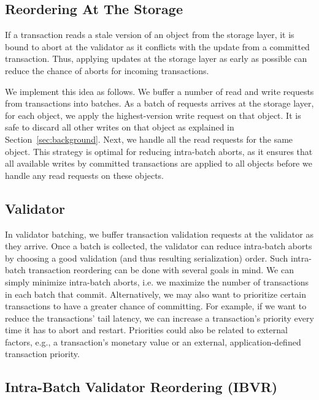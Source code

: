 \subsection{Reordering At The Storage}
If a transaction reads a stale version of an object from the storage layer, it is bound to 
abort at the validator as it conflicts with the update from a committed transaction. 
Thus, applying updates at the storage layer as early as possible can 
reduce the chance of aborts for incoming transactions.

We implement this idea as follows. We buffer a number of read and write requests from transactions into batches. 
As a batch of requests arrives at the storage layer, for each object, we apply the highest-version write request on that object. It is safe to discard all other writes on that object as explained in Section~\ref{sec:background}. Next, we handle all the read requests for the same object. This strategy is optimal for reducing intra-batch aborts, as it ensures that all available writes by committed transactions are applied to all objects before we handle any read requests on these objects. 

\subsection{Validator}\label{subsec:validator_reordering}

In validator batching, we buffer transaction validation requests at the validator as they arrive. Once a batch is collected, the validator can reduce intra-batch aborts by choosing a good validation (and thus resulting serialization) order.
Such intra-batch transaction reordering can be done with several goals in mind. We can simply minimize intra-batch aborts, i.e. we maximize the number of transactions in each batch that commit. Alternatively, we may also want to prioritize certain transactions to have a greater chance of committing. For example, if we want to reduce the transactions' tail latency, we can increase a transaction's priority every time it has to abort and restart. Priorities could also be related to external factors, e.g., a transaction's monetary value or an external, application-defined transaction priority. 

\subsection{Intra-Batch Validator Reordering (IBVR)}\label{sec:ibvr}
\label{subsec:validator_reordering:algorithm}


